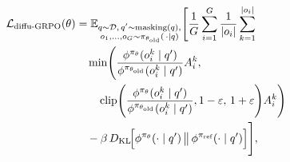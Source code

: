 \begin{equation}
\begin{aligned}
\mathcal{L}_{\text{diffu-GRPO}}(\theta) &= \mathbb{E}_{\substack{q \sim \mathcal{D},\, q' \sim \text{masking}(q),\\
              o_1,\dots,o_G \sim \pi_{\theta_{\text{old}}}(\,\cdot \mid q)}}\Bigg[
\frac{1}{G}\sum_{i=1}^{G}\frac{1}{|o_i|}\sum_{k=1}^{|o_i|}\\
&\quad\min\!\Bigg(
      \frac{\phi^{\pi_\theta}(o^k_i \mid q')}
           {\phi^{\pi_{\theta_{\text{old}}}}(o^k_i \mid q')}A_i^{k},\\
&\qquad\operatorname{clip}\!\Bigg(
        \frac{\phi^{\pi_\theta}(o^k_i \mid q')}
             {\phi^{\pi_{\theta_{\text{old}}}}(o^k_i \mid q')},
        1-\varepsilon,\,1+\varepsilon
  \Bigg)A_i^{k}
\Bigg)\\
&\quad-\beta\,D_{\text{KL}}\!\Bigl[
   \phi^{\pi_\theta}(\cdot \mid q')\,\bigl\|\,\phi^{\pi_{\text{ref}}}(\cdot \mid q')
\Bigr]
\Bigg],
\end{aligned}
\label{eq:diffugrpo}
\end{equation}